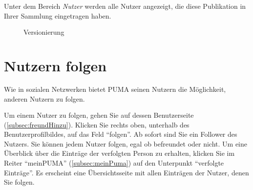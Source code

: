 Unter dem Bereich \textit{Nutzer} werden alle Nutzer angezeigt, die diese Publikation in Ihrer Sammlung eingetragen haben.
\begin{figure}[h!]
 \centering
 \caption{Versionierung}
 \label{fig:versionierung}
\end{figure}
\section{Nutzern folgen}
\label{sec:nutzernFolgen}
Wie in sozialen Netzwerken bietet PUMA seinen Nutzern die Möglichkeit, anderen Nutzern zu folgen. 

Um einem Nutzer zu folgen, gehen Sie auf dessen Benutzerseite (\autoref{subsec:freundHinzu}). Klicken Sie rechts oben, unterhalb des Benutzerprofilbildes, auf das Feld \enquote{folgen}. Ab sofort sind Sie ein Follower des Nutzers. Sie können jedem Nutzer folgen, egal ob befreundet oder nicht. \newline \newline
Um eine Überblick über die Einträge der verfolgten Person zu erhalten, klicken Sie im Reiter \enquote{meinPUMA} (\autoref{subsec:meinPuma}) auf den Unterpunkt \enquote{verfolgte Einträge}. Es erscheint eine Übersichtsseite mit allen Einträgen der Nutzer, denen Sie folgen. 





